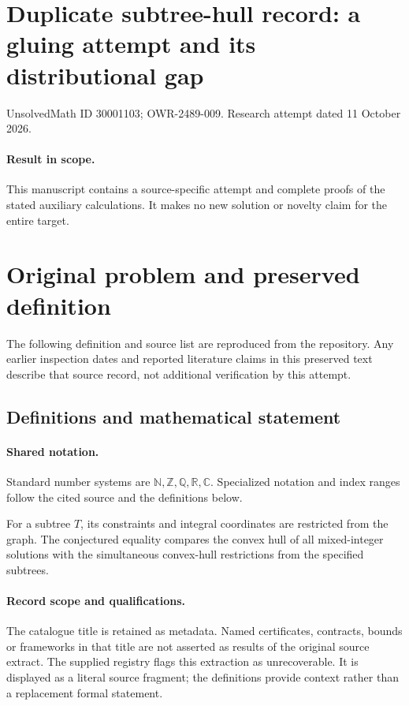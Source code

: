 \documentclass[11pt]{article}
\begin{document}
\section*{Duplicate subtree-hull record: a gluing attempt and its distributional gap}
\noindent UnsolvedMath ID 30001103; OWR-2489-009. Research attempt dated 11 October 2026.
\paragraph{Result in scope.}This manuscript contains a source-specific attempt and complete proofs of the stated auxiliary calculations. It makes no new solution or novelty claim for the entire target.
\section{Original problem and preserved definition}
The following definition and source list are reproduced from the repository. Any earlier inspection dates and reported literature claims in this preserved text describe that source record, not additional verification by this attempt.
\subsection{Definitions and mathematical statement}

\paragraph{Shared notation.}Standard number systems are $\mathbb N,\mathbb Z,\mathbb Q,\mathbb R,\mathbb C$. Specialized notation and index ranges follow the cited source and the definitions below.


For a subtree $T$, its constraints and integral coordinates are restricted from the graph. The conjectured equality compares the convex hull of all mixed-integer solutions with the simultaneous convex-hull restrictions from the specified subtrees.
\paragraph{Record scope and qualifications.}
The catalogue title is retained as metadata. Named certificates, contracts, bounds or frameworks in that title are not asserted as results of the original source extract.
The supplied registry flags this extraction as unrecoverable. It is displayed as a literal source fragment; the definitions provide context rather than a replacement formal statement.
\end{document}
